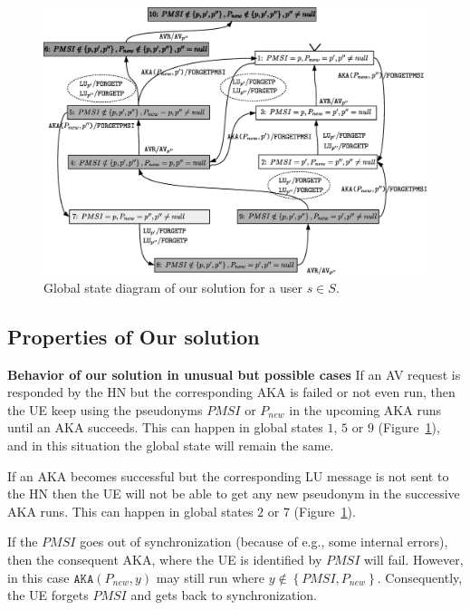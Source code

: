 \documentclass{llncs} %
\begin{document}
\begin{figure}[!tbp]
  \centering
    \includegraphics[scale = .35,clip = true,trim = 0cm 0cm 0cm 0cm]{solution_diagram.eps}
 \caption{Global state diagram of our solution for a user $s \in S$.}
  \label{fig:solution_diagram}
\end{figure}


\subsection{Properties of Our solution}



\textbf{Behavior of our solution in unusual but possible cases}
If an AV request is responded by the HN but the corresponding AKA is failed or not even run, then the UE keep using the pseudonyms $PMSI$ or $P_{new}$ in the upcoming AKA runs until an AKA succeeds. This can happen in global states $1$, $5$ or $9$ (Figure~\ref{fig:solution_diagram}), and in this situation the global state will remain the same.

If an AKA becomes successful but the corresponding LU message is not sent to the HN then the UE will not be able to get any new pseudonym in the successive AKA runs. This can happen in global states $2$ or $7$ (Figure~\ref{fig:solution_diagram}).

If the $PMSI$ goes out of synchronization (because of e.g., some internal errors), then the consequent AKA, where the UE is identified by $PMSI$ will fail. However, in this case $\texttt{AKA}(P_{new},y)$ may still run where $y \notin \left\lbrace PMSI,P_{new} \right\rbrace$. Consequently, the UE forgets $PMSI$ and gets back to synchronization. 
\end{document}

